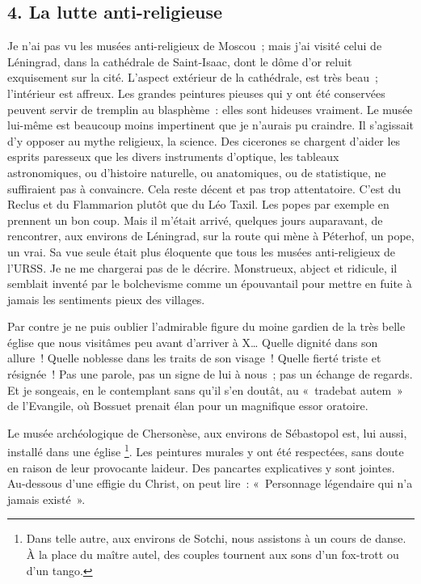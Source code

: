\documentclass[french,twoside]{book} %
\begin{document}
\subsection[{4. La lutte anti-religieuse}]{4. La lutte anti-religieuse}
\noindent Je n’ai pas vu les musées anti-religieux de Moscou ; mais j’ai visité celui de Léningrad, dans la cathédrale de Saint-Isaac, dont le dôme d’or reluit exquisement sur la cité. L’aspect extérieur de la cathédrale, est très beau ; l’intérieur est affreux. Les grandes peintures pieuses qui y ont été conservées peuvent servir de tremplin au blasphème : elles sont hideuses vraiment. Le musée lui-même est beaucoup moins impertinent que je n’aurais pu craindre. Il s’agissait d’y opposer au mythe religieux, la science. Des cicerones se chargent d’aider les esprits paresseux que les divers instruments d’optique, les tableaux astronomiques, ou d’histoire naturelle, ou anatomiques, ou de statistique, ne suffiraient pas à convaincre. Cela reste décent et pas trop attentatoire. C’est du Reclus et du Flammarion plutôt que du Léo Taxil. Les popes par exemple en prennent un bon coup. Mais il m’était arrivé, quelques jours auparavant, de rencontrer, aux environs de Léningrad, sur la route qui mène à Péterhof, un pope, un vrai. Sa vue seule était plus éloquente que tous les musées anti-religieux de l’URSS. Je ne me chargerai pas de le décrire. Monstrueux, abject et ridicule, il semblait inventé par le bolchevisme comme un épouvantail pour mettre en fuite à jamais les sentiments pieux des villages.\par
Par contre je ne puis oublier l’admirable figure du moine gardien de la très belle église que nous visitâmes peu avant d’arriver à X… Quelle dignité dans son allure ! Quelle noblesse dans les traits de son visage ! Quelle fierté triste et résignée ! Pas une parole, pas un signe de lui à nous ; pas un échange de regards. Et je songeais, en le contemplant sans qu’il s’en doutât, au « tradebat autem » de l’Evangile, où Bossuet prenait élan pour un magnifique essor oratoire.\par
Le musée archéologique de Chersonèse, aux environs de Sébastopol est, lui aussi, installé dans une église \footnote{Dans telle autre, aux environs de Sotchi, nous assistons à un cours de danse. À la place du maître autel, des couples tournent aux sons d’un fox-trott ou d’un tango.}. Les peintures murales y ont été respectées, sans doute en raison de leur provocante laideur. Des pancartes explicatives y sont jointes. Au-dessous d’une effigie du Christ, on peut lire : « Personnage légendaire qui n’a jamais existé ».\par
\end{document}
